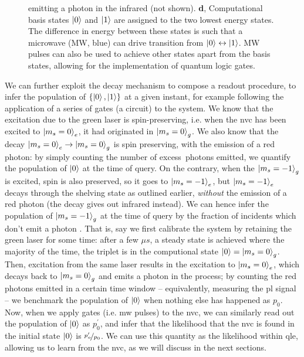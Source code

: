 \begin{figure}[t]
{            emitting a photon in the infrared (not shown).
        \textbf{d}, Computational basis states $\ket{0}$ and $\ket{1}$ are assigned to the two lowest energy states.
            The difference in energy between these states is such that a microwave (MW, blue) 
                can drive transition from $\ket{0} \leftrightarrow \ket{1}$.
            MW pulses can also be used to achieve other states apart from the basis states,
                allowing for the implementation of quantum logic gates. 
    }
    \label{fig:nv_centre_energy_levels}
\end{figure}


We can further exploit the decay mechanism to compose a readout procedure, 
    to infer the population of $\{\ket{0}, \ket{1}\}$ at a given instant, 
    for example following the application of a series of gates (a circuit) to the system. 
We know that the excitation due to the green laser is spin-preserving, 
    i.e. when the \gls{nvc} has been excited to $\ket{m_s=0}_e$, 
    it had originated in $\ket{m_s=0}_g$.
We also know that the decay $\ket{m_s=0}_e \rightarrow \ket{m_s=0}_g$ is spin preserving, with the emission of 
    a red photon: by simply counting the number of excess\footnotemark \ photons emitted, 
    we quantify the population of $\ket{0}$ at the time of query. 
On the contrary, when the $\ket{m_s=-1}_g$ is excited, 
    spin is also preserved, so it goes to $\ket{m_s=-1}_e$, 
    but $\ket{m_s=-1}_e$ decays through the shelving state as outlined earlier, 
    \emph{without} the emission of a red photon (the decay gives out infrared instead). 
We can hence infer the population of $\ket{m_s=-1}_g$ at the time of query by the fraction of incidents which don't 
    emit a photon \cite{knauer2016photonic}.
That is, say we first calibrate the system by retaining the green laser for some time: 
    after a few $\mu s$, a steady state is achieved where the majority of the time, the triplet is in the computional state $\ket{0} = \ket{m_s=0}_g$. 
Then, excitation from the same laser results in the excitation to $\ket{m_s=0}_e$, 
    which decays back to $\ket{m_s=0}_g$ and emits a photon in the process; 
    by counting the red photons emitted in a certain time window -- equivalently, measuring the \gls{pl} signal -- 
    we benchmark the population of $\ket{0}$ when nothing else has happened as $p_0$. 
Now, when we apply gates (i.e. \gls{mw} pulses) to the \gls{nvc}, 
    we can similarly read out the population of $\ket{0}$ as $p_0^{\prime}$,
    and infer that the \gls{likelihood} that the \gls{nvc} is found in the initial state $\ket{0}$ is $\nicefrac{p_o^{\prime}}{p_0}$. 
We can use this quantity as the  \gls{likelihood} within \gls{qle}, allowing us to learn from the \gls{nvc},
    as we will discuss in the next sections. 

